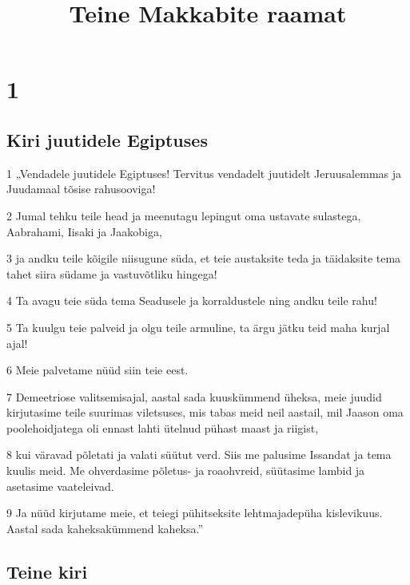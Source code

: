 

\title{Teine Makkabite raamat}

\chapter{1}


\section*{Kiri juutidele Egiptuses}

\par 1 „Vendadele juutidele Egiptuses! Tervitus vendadelt juutidelt Jeruusalemmas ja Juudamaal tõsise rahusooviga!
\par 2 Jumal tehku teile head ja meenutagu lepingut oma ustavate sulastega, Aabrahami, Iisaki ja Jaakobiga,
\par 3 ja andku teile kõigile niisugune süda, et teie austaksite teda ja täidaksite tema tahet siira südame ja vastuvõtliku hingega!
\par 4 Ta avagu teie süda tema Seadusele ja korraldustele ning andku teile rahu!
\par 5 Ta kuulgu teie palveid ja olgu teile armuline, ta ärgu jätku teid maha kurjal ajal!
\par 6 Meie palvetame nüüd siin teie eest.
\par 7 Demeetriose valitsemisajal, aastal sada kuuskümmend üheksa, meie juudid kirjutasime teile suurimas viletsuses, mis tabas meid neil aastail, mil Jaason oma poolehoidjatega oli ennast lahti ütelnud pühast maast ja riigist,
\par 8 kui väravad põletati ja valati süütut verd. Siis me palusime Issandat ja tema kuulis meid. Me ohverdasime põletus- ja roaohvreid, süütasime lambid ja asetasime vaateleivad.
\par 9 Ja nüüd kirjutame meie, et teiegi pühitseksite lehtmajadepüha kislevikuus. Aastal sada kaheksakümmend kaheksa.”


\section*{Teine kiri}

